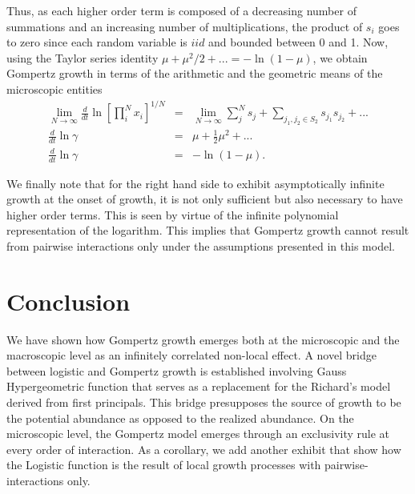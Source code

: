 \documentclass{article}
\begin{document}
Thus, as each higher order term is composed of a decreasing number of summations and an increasing number of multiplications, the product of $s_i$ goes to zero since each random variable is $iid$ and bounded between 0 and 1. 
Now, using the Taylor series identity $\mu+\mu^2/2+... = -\ln(1-\mu)$, we obtain Gompertz growth in terms of the arithmetic and the geometric means of the microscopic entities
\begin{eqnarray*}
\label{eq:MicroGomp13}
\lim_{N\rightarrow \infty}\frac{d}{dt} \ln \left[ \prod_i^N x_i \right ]^{1/N} &=&  \lim_{N\rightarrow \infty}\sum_j^N s_{j} + \sum_{j_1, j_2 \in S_2} s_{j_1}s_{j_2} + ...\\
\frac{d}{dt} \ln \gamma &=&  \mu + \frac{1}{2} \mu^2 + ...\\
\frac{d}{dt} \ln \gamma &=& - \ln (1-\mu).
\end{eqnarray*}

We finally note that for the right hand side to exhibit asymptotically infinite growth at the onset of growth, it is not only sufficient but also necessary to have higher order terms. This is seen by virtue of the infinite polynomial representation of the logarithm. This implies that Gompertz growth cannot result from pairwise interactions only under the assumptions presented in this model.

\section{Conclusion}
\label{sec:discussion}

We have shown how Gompertz growth emerges both at the microscopic and the macroscopic level as an infinitely correlated non-local effect. A novel bridge between logistic and Gompertz growth is established involving Gauss Hypergeometric function that serves as a replacement for the Richard's model derived from first principals. This bridge presupposes the source of growth to be the potential abundance as opposed to the realized abundance. On the microscopic level, the Gompertz model emerges through an exclusivity rule at every order of interaction. As a corollary, we add another exhibit that show how the Logistic function is the result of local growth processes with pairwise-interactions only. 
\end{document}
